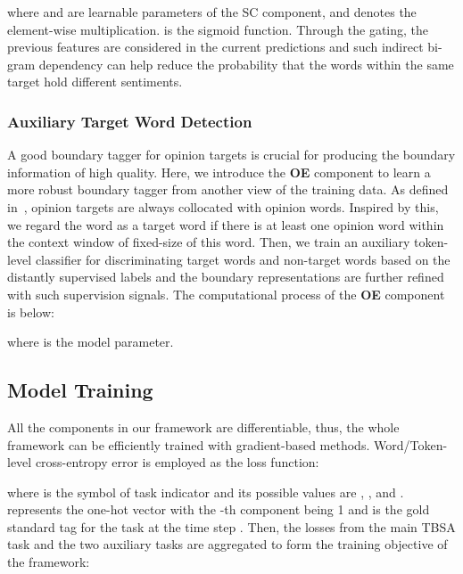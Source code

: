 \documentclass[letterpaper]{article} \usepackage{aaai19}  \usepackage{times}  \usepackage{helvet}  \usepackage{courier}  \usepackage{url}  \usepackage{graphicx}  \frenchspacing  \setlength{\pdfpagewidth}{8.5in}  \setlength{\pdfpageheight}{11in}
\begin{document}
where  and  are learnable parameters of the SC component, and  denotes the element-wise multiplication.  is the sigmoid function. Through the gating, the previous features are considered in the current predictions and such indirect bi-gram dependency can help reduce the probability that the words within the same target hold different sentiments.

\subsubsection{Auxiliary Target Word Detection}
A good boundary tagger for opinion targets is crucial for producing the boundary information of high quality. Here, we introduce the \textbf{OE} component to learn a more robust boundary tagger from another view of the training data. As defined in~\cite{S14-2004,S15-2082,S16-1002}, opinion targets are always collocated with opinion words. Inspired by this, we regard the word as a target word if there is at least one opinion word within the context window of fixed-size  of this word. Then, we train an auxiliary token-level classifier for discriminating target words and non-target words based on the distantly supervised labels and the boundary representations  are further refined with such supervision signals. The computational process of the \textbf{OE} component is below:      

where  is the model parameter.

\subsection{Model Training}
All the components in our framework are differentiable, thus, the whole framework can be efficiently trained with gradient-based methods. Word/Token-level cross-entropy error is employed as the loss function:

where  is the symbol of task indicator and its possible values are , , and .  represents the one-hot vector with the -th component being 1 and  is the gold standard tag for the task  at the time step . Then, the losses from the main TBSA task and the two auxiliary tasks are aggregated to form the training objective  of the framework:
\end{document}
